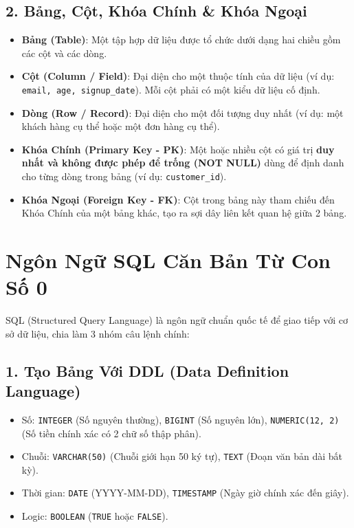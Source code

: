 \subsection{2. Bảng, Cột, Khóa Chính \& Khóa Ngoại}
\begin{itemize}
    \item \textbf{Bảng (Table)}: Một tập hợp dữ liệu được tổ chức dưới dạng hai chiều gồm các cột và các dòng.
    \item \textbf{Cột (Column / Field)}: Đại diện cho một thuộc tính của dữ liệu (ví dụ: \texttt{email, age, signup\_date}). Mỗi cột phải có một kiểu dữ liệu cố định.
    \item \textbf{Dòng (Row / Record)}: Đại diện cho một đối tượng duy nhất (ví dụ: một khách hàng cụ thể hoặc một đơn hàng cụ thể).
    \item \textbf{Khóa Chính (Primary Key - PK)}: Một hoặc nhiều cột có giá trị \textbf{duy nhất và không được phép để trống (NOT NULL)} dùng để định danh cho từng dòng trong bảng (ví dụ: \texttt{customer\_id}).
    \item \textbf{Khóa Ngoại (Foreign Key - FK)}: Cột trong bảng này tham chiếu đến Khóa Chính của một bảng khác, tạo ra sợi dây liên kết quan hệ giữa 2 bảng.
\end{itemize}

\section{Ngôn Ngữ SQL Căn Bản Từ Con Số 0}

SQL (Structured Query Language) là ngôn ngữ chuẩn quốc tế để giao tiếp với cơ sở dữ liệu, chia làm 3 nhóm câu lệnh chính:

\subsection{1. Tạo Bảng Với DDL (Data Definition Language)}

\begin{thuchanhbox}
\begin{itemize}
    \item Số: \texttt{INTEGER} (Số nguyên thường), \texttt{BIGINT} (Số nguyên lớn), \texttt{NUMERIC(12, 2)} (Số tiền chính xác có 2 chữ số thập phân).
    \item Chuỗi: \texttt{VARCHAR(50)} (Chuỗi giới hạn 50 ký tự), \texttt{TEXT} (Đoạn văn bản dài bất kỳ).
    \item Thời gian: \texttt{DATE} (YYYY-MM-DD), \texttt{TIMESTAMP} (Ngày giờ chính xác đến giây).
    \item Logic: \texttt{BOOLEAN} (\texttt{TRUE} hoặc \texttt{FALSE}).
\end{itemize}
\end{thuchanhbox}

